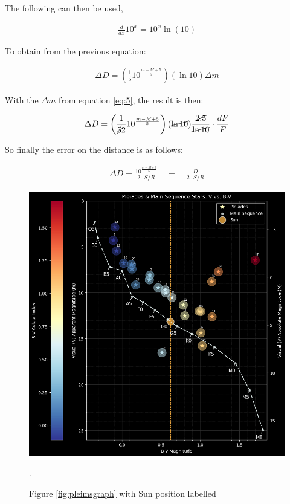 \documentclass[12pt]{article}
\begin{document}
The following can then be used,

\vspace{-1.5ex}
\begin{gather*}
    \frac{d}{dx}10^{x} = 10^{x} \ln(10)
\end{gather*}

To obtain from the previous equation:

\vspace{-1.5ex}
\begin{gather*}
    \Delta D = \left( \frac{1}{5} 10^{\frac{m-M+5}{5}} \right) \left( \ln 10 \right) \Delta m
\end{gather*}

With the $\Delta m$ from equation \ref{eq:5}, the result is then:

\vspace{-1.5ex}
\begin{gather*}
    \Delta D = \left( \frac{1}{\cancel{5}2} 10^{\frac{m-M+5}{5}} \right) (\cancel{\ln 10}) \frac{\cancel{2.5}}{\cancel{\ln 10}} \cdot \frac{dF}{F}
\end{gather*}

So finally the error on the distance is as follows:

\vspace{-1.5ex}
\begin{gather}
    \Delta D = \frac{10^{\frac{m-M+5}{5}}}{2 \cdot S/R} \quad = \quad \frac{D}{2 \cdot S/R}
\end{gather}

\begin{figure}[H]
    \centering
    \includegraphics[width=12.5cm]{pleimsgraph sun.png}
    \caption{\centering Figure \ref{fig:pleimsgraph} with Sun position labelled}.
    \label{fig:sunfeature}
\end{figure}
\end{document}

